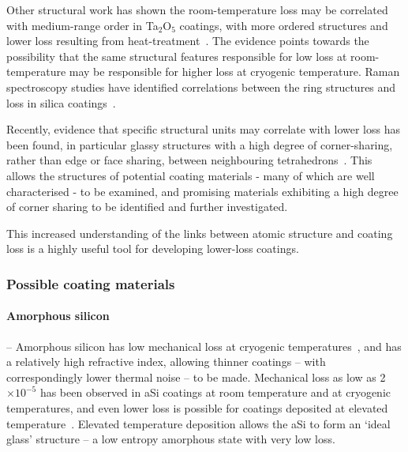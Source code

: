 Other structural work has shown the room-temperature loss may be correlated with medium-range order in Ta$_2$O$_5$ coatings, with more ordered structures and lower loss resulting from heat-treatment~\cite{Hart2016}. The evidence points towards the possibility that the same structural features responsible for low loss at room-temperature may be responsible for higher loss at cryogenic temperature. Raman spectroscopy studies have identified correlations between the ring structures and loss in silica coatings~\cite{granata2018correlated}. 

Recently, evidence that specific structural units may correlate with lower loss has been found, in particular glassy structures with a high degree of corner-sharing, rather than edge or face sharing, between neighbouring tetrahedrons~\cite{Parsai2019}. This allows the structures of potential coating materials - many of which are well characterised - to be examined, and promising materials exhibiting a high degree of corner sharing to be identified and further investigated.

This increased understanding of the links between atomic structure and coating loss is a highly useful tool for developing lower-loss coatings.

\subsubsection{Possible coating materials}

\paragraph{Amorphous silicon} --  Amorphous silicon has low mechanical loss at cryogenic temperatures~\cite{Liu_1997,Murray2015}, and has a relatively high refractive index, allowing thinner coatings -- with correspondingly lower thermal noise -- to be made. Mechanical loss as low as 2$\times10^{-5}$ has been observed in aSi coatings at room temperature and at cryogenic temperatures, and even lower loss is possible for coatings deposited at elevated temperature~\cite{Liu2014}. Elevated temperature deposition allows the aSi to form an `ideal glass' structure -- a low entropy amorphous state with very low loss.

